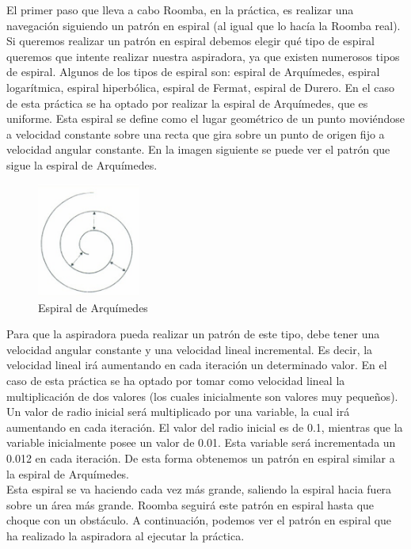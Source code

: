 El primer paso que lleva a cabo Roomba, en la práctica, es realizar una navegación siguiendo un patrón en espiral (al igual que lo hacía la Roomba real). Si queremos realizar un patrón en espiral debemos elegir qué tipo de espiral queremos que intente realizar nuestra aspiradora, ya que existen numerosos tipos de espiral. Algunos de los tipos de espiral son: espiral de Arquímedes, espiral logarítmica, espiral hiperbólica, espiral de Fermat, espiral de Durero. En el caso de esta práctica se ha optado por realizar la espiral de Arquímedes, que es uniforme. Esta espiral se define como el lugar geométrico de un punto moviéndose a velocidad constante sobre una recta que gira sobre un punto de origen fijo a velocidad angular constante. En la imagen siguiente se puede ver el patrón que sigue la espiral de Arquímedes.\\

\begin{figure}[H]
  \begin{center}
    \includegraphics[width=0.3\textwidth]{figures/Vacuum/Espiral_Arquimedes.png}
		\caption{Espiral de Arquímedes}
		\label{fig.Espiral_Arquimedes}
		\end{center}
\end{figure}

Para que la aspiradora pueda realizar un patrón de este tipo, debe tener una velocidad angular constante y una velocidad lineal incremental. Es decir, la velocidad lineal irá aumentando en cada iteración un determinado valor. En el caso de esta práctica se ha optado por tomar como velocidad lineal la multiplicación de dos valores (los cuales inicialmente son valores muy pequeños). Un valor de radio inicial será multiplicado por una variable, la cual irá aumentando en cada iteración. El valor del radio inicial es de 0.1, mientras que la variable inicialmente posee un valor de 0.01. Esta variable será incrementada un 0.012 en cada iteración. De esta forma obtenemos un patrón en espiral similar a la espiral de Arquímedes.\\

Esta espiral se va haciendo cada vez más grande, saliendo la espiral hacia fuera sobre un área más grande. Roomba seguirá este patrón en espiral hasta que choque con un obstáculo. A continuación, podemos ver el patrón en espiral que ha realizado la aspiradora al ejecutar la práctica.\\

